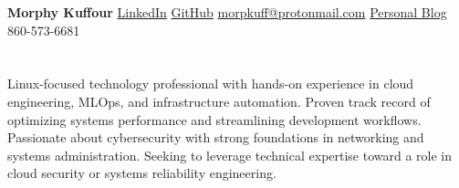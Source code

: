 \documentclass[a4paper,11pt]{article}
\begin{document}

  \textbf{Morphy Kuffour} \textbar{} \href{https://www.linkedin.com/in/morphy-kuffour/}{LinkedIn} \textbar{} \href{https://github.com/morphykuffour}{GitHub} \textbar{} \href{mailto:morpkuff@protonmail.com}{morpkuff@protonmail.com} \textbar{} \href{https://morphykuffour.github.io/}{Personal Blog} \textbar{} 860-573-6681

\vspace{-13pt}



\section{}
Linux-focused technology professional with hands-on experience in cloud engineering, MLOps, and infrastructure automation. Proven track record of optimizing systems performance and streamlining development workflows. Passionate about cybersecurity with strong foundations in networking and systems administration. Seeking to leverage technical expertise toward a role in cloud security or systems reliability engineering.
\end{document}
